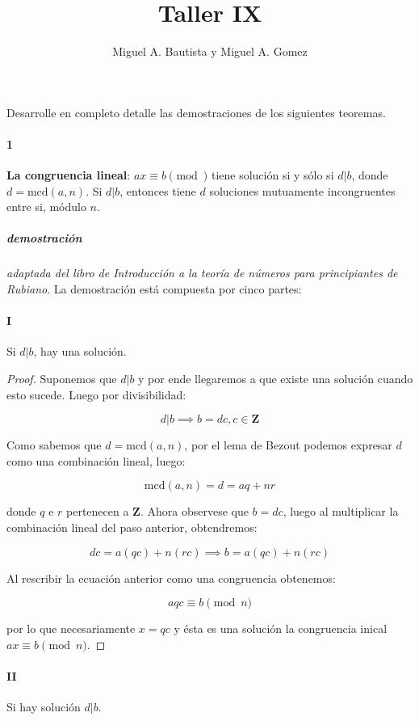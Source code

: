 \documentclass{article}
\title{Taller IX}
\author{Miguel A. Bautista y Miguel A. Gomez}
\begin{document}
	\maketitle
	
Desarrolle en completo detalle las demostraciones de los siguientes teoremas.

\paragraph{1} \textbf{La congruencia lineal}: $ax \equiv b\pmod{}$ tiene solución si y sólo si $d|b$, donde $d = \text{mcd}(a,n)$. Si $d|b$, entonces tiene $d$ soluciones mutuamente incongruentes entre si, módulo $n$.

\subparagraph{demostración} \textit{adaptada del libro de Introducción a la teoría de números para principiantes de Rubiano}. La demostración está compuesta por cinco partes:

\paragraph{I} Si $d|b$, hay una solución.

\begin{proof}
Suponemos que $d|b$ y por ende llegaremos a que existe una solución cuando esto sucede. Luego por divisibilidad:

$$d|b \implies b = dc, c \in \mathbf{Z}$$

Como sabemos que $d =\text{mcd}(a,n)$, por el lema de Bezout podemos expresar $d$ como una combinación lineal, luego:

$$\text{mcd}(a,n) = d = aq + nr$$

donde $q$ e $r$ pertenecen a $\mathbf{Z}$. Ahora observese que $b = dc$, luego al multiplicar la combinación lineal del paso anterior, obtendremos:

$$dc = a(qc) + n(rc) \implies b = a(qc) + n(rc)$$

Al rescribir la ecuación anterior como una congruencia obtenemos:

$$aqc \equiv b \pmod{n}$$

por lo que necesariamente $x = qc$ y ésta es una solución la congruencia inical $ax \equiv b \pmod{n}$.
\end{proof}

\paragraph{II} Si hay solución $d|b$.
\end{document}
